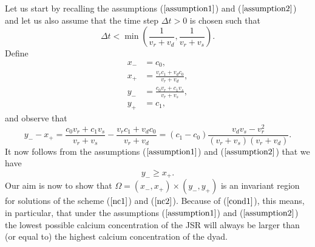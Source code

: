 Let us start by recalling the assumptions ($\ref{assumption1}$) and ($\ref{assumption2}$) and let us also assume that the time step $\Delta t>0$ is chosen such that
\begin{equation}
\Delta t<\min\left(  \frac{1}{v_{r}+v_{d}},\frac{1}{v_{r}+v_{s}}\right).
\label{dt}
\end{equation}
Define 
\begin{align}
x_{-}  &  =c_{0},\text{ } \label{xm}\\
x_{+}  &  =\frac{v_{r}c_{1}+v_{d}c_{0}}{v_{r}+v_{d}}, \label{xp}\\
y_{-}  &  =\frac{c_{0}v_{r}+c_{1}v_{s}}{v_{r}+v_{s}}, \label{ym}\\
y_{+}  &  =c_{1}, \label{yp}
\end{align}
and observe that
\[
y_{-}-x_{+}=\frac{c_{0}v_{r}+c_{1}v_{s}}{v_{r}+v_{s}}-\frac{v_{r}c_{1}
+v_{d}c_{0}}{v_{r}+v_{d}}=\left(  c_{1}-c_{0}\right)  \frac{v_{d}v_{s}
-v_{r}^{2}}{\left(  v_{r}+v_{s}\right)  \left(  v_{r}+v_{d}\right)  }.
\]
It now follows from the assumptions  ($\ref{assumption1}$) and ($\ref{assumption2}$)  that we have
\begin{equation}
y_{-}\geqslant x_{+}. \label{cond1}
\end{equation}
Our aim is now to show that $\Omega=(x_{-},x_{+})\times(y_{-},y_{+})$ is an invariant region for solutions of the scheme ($\ref{nc1}$) and ($\ref{nc2}$).
Because of ($\ref{cond1}$), this means, in particular, that under the assumptions ($\ref{assumption1}$) and ($\ref{assumption2}$) the lowest possible 
calcium concentration of the JSR will always be larger than (or equal to) the
highest calcium concentration of the dyad.

